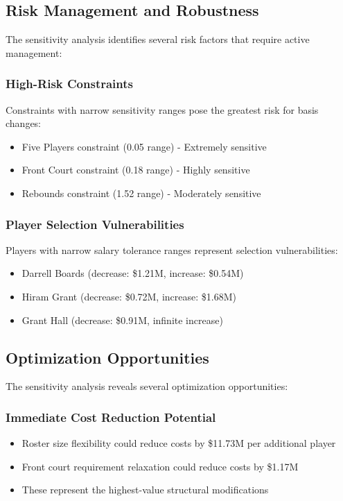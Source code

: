 \documentclass[a4paper,11pt]{article}
\begin{document}
\subsection{Risk Management and Robustness}

The sensitivity analysis identifies several risk factors that require active management:

\subsubsection{High-Risk Constraints}
Constraints with narrow sensitivity ranges pose the greatest risk for basis changes:
\begin{itemize}
    \item Five Players constraint (0.05 range) - Extremely sensitive
    \item Front Court constraint (0.18 range) - Highly sensitive
    \item Rebounds constraint (1.52 range) - Moderately sensitive
\end{itemize}

\subsubsection{Player Selection Vulnerabilities}
Players with narrow salary tolerance ranges represent selection vulnerabilities:
\begin{itemize}
    \item Darrell Boards (decrease: \$1.21M, increase: \$0.54M)
    \item Hiram Grant (decrease: \$0.72M, increase: \$1.68M)
    \item Grant Hall (decrease: \$0.91M, infinite increase)
\end{itemize}

\subsection{Optimization Opportunities}

The sensitivity analysis reveals several optimization opportunities:

\subsubsection{Immediate Cost Reduction Potential}
\begin{itemize}
    \item Roster size flexibility could reduce costs by \$11.73M per additional player
    \item Front court requirement relaxation could reduce costs by \$1.17M
    \item These represent the highest-value structural modifications
\end{itemize}
\end{document}
